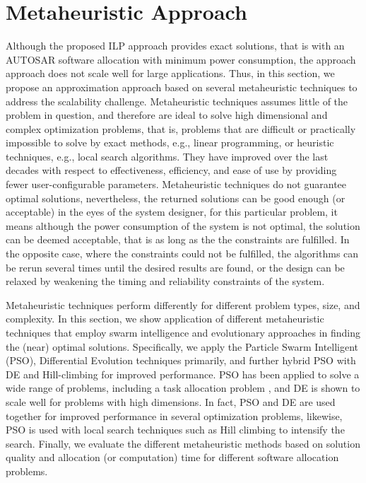 \section{Metaheuristic Approach}
Although the proposed ILP approach provides exact solutions, that is with an AUTOSAR software allocation with minimum power consumption, the approach approach does not scale well for large applications. Thus, in this section, we propose an approximation approach based on several metaheuristic techniques to address the scalability challenge. Metaheuristic techniques assumes little of the problem in question, and therefore are ideal to solve high dimensional and complex optimization problems, that is, problems that are difficult or practically impossible to solve by exact methods, e.g., linear programming, or heuristic techniques, e.g., local search algorithms. They have improved over the last decades with respect to effectiveness, efficiency, and ease of use by providing fewer user-configurable parameters. Metaheuristic techniques do not guarantee optimal solutions, nevertheless, the returned solutions can be good enough (or acceptable) in the eyes of the system designer, for this particular problem, it means although the power consumption of the system is not optimal, the solution can be deemed acceptable, that is as long as the the constraints are fulfilled. In the opposite case, where the constraints could not be fulfilled, the algorithms can be rerun several times until the desired results are found, or the design can be relaxed by weakening the timing and reliability constraints of the system.

Metaheuristic techniques perform differently for different problem types, size, and complexity. In this section, we show application of different metaheuristic techniques that employ swarm intelligence and evolutionary approaches in finding the (near) optimal solutions. Specifically, we apply the Particle Swarm Intelligent (PSO), Differential Evolution techniques primarily, and further hybrid PSO with DE and Hill-climbing for improved performance. PSO has been applied to solve a wide range of problems, including a task allocation problem \cite{yin2007task}, and DE is shown to scale well for problems with high dimensions. In fact, PSO and DE are used together for improved performance in several optimization problems, likewise, PSO is used with local search techniques such as Hill climbing to intensify the search. Finally, we evaluate the different metaheuristic methods based on solution quality and allocation (or computation) time for different software allocation problems.

